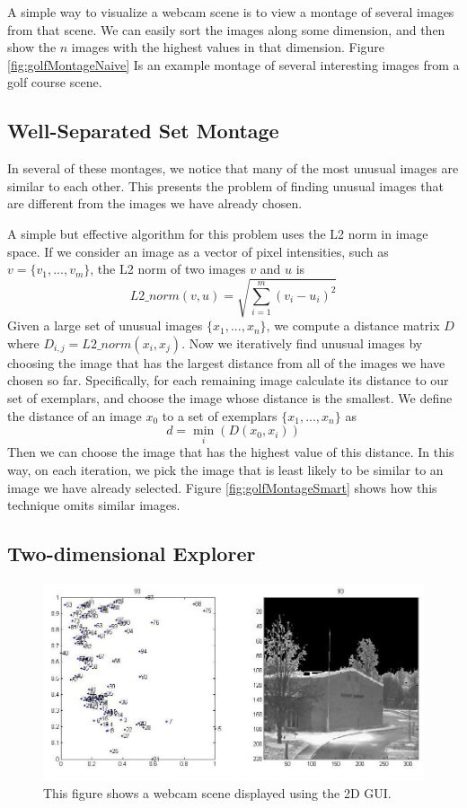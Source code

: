 A simple way to visualize a webcam scene is to view a montage of several images from that scene.  We can easily sort the images along some dimension, and then show the $n$ images with the highest values in that dimension.  Figure \ref{fig:golfMontageNaive} Is an example montage of several interesting images from a golf course scene.

\subsection{Well-Separated Set Montage}

In several of these montages, we notice that many of the most unusual images are similar to each other.  This presents the problem of finding unusual images that are different from the images we have already chosen.

A simple but effective algorithm for this problem uses the L2 norm in image space.  If we consider an image as a vector of pixel intensities, such as $v = \{v_1, ..., v_m\}$, the L2 norm of two images $v$ and $u$ is $$L2\_norm(v,u) = \sqrt{\sum_{i=1}^m{(v_i-u_i)^2}}$$  Given a large set of unusual images $\{x_1, ..., x_n\}$, we compute a distance matrix $D$ where $D_{i,j} = L2\_norm(x_i, x_j).$  Now we iteratively find unusual images by choosing the image that has the largest distance from all of the images we have chosen so far.  Specifically, for each remaining image calculate its distance to our set of exemplars, and choose the image whose distance is the smallest.  We define the distance of an image $x_0$ to a set of exemplars $\{x_1, ..., x_n\}$ as $$d = \min_i(D(x_0, x_i))$$Then we can choose the image that has the highest value of this distance.  In this way, on each iteration, we pick the image that is least likely to be similar to an image we have already selected.  Figure \ref{fig:golfMontageSmart} shows how this technique omits similar images.

\subsection{Two-dimensional Explorer}

\begin{figure}[h]
	\centering
		\includegraphics[width=1\textwidth]{figures/2dGui.jpg}
	
		\caption[Exploring 2D image space using a simple GUI.]{This figure shows a webcam scene displayed using the 2D GUI.}	
		
	\label{fig:2dGui}	
\end{figure}

